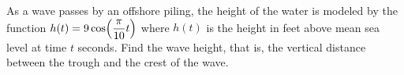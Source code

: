 \documentclass[12pt,answers]{exam}
\let\originalleft\left
\let\originalright\right
\renewcommand{\left}{\mathopen{}\mathclose\bgroup\originalleft}
\renewcommand{\right}{\aftergroup\egroup\originalright}
\begin{document}
\begin{questions}
\question[1] As a wave passes by an offshore piling, the height of the water is modeled by the function
$\displaystyle h(t) = 9 \cos\left (\frac{\pi}{10}t\right )$ where $h(t)$ is the height in feet above mean sea level at time $t$ seconds. Find the wave height, that is, the vertical distance between the trough and the crest of the wave.
\fillwithdottedlines{2.5cm}


\end{questions}
\end{document}
